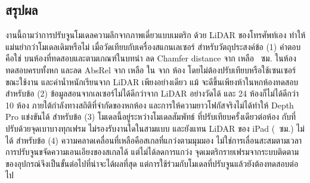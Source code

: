\subsection{สรุปผล}\label{sec:conclusion}
งานนี้ถามว่าการปรับจูนโมเดลความลึกจากภาพเดี่ยวแบบเมตริก ด้วย LiDAR ของโทรศัพท์เอง
ทำให้แม่นยำกว่าโมเดลเดิมหรือไม่ เมื่อวัดเทียบกับเครื่องสแกนเลเซอร์ สำหรับวัตถุประสงค์ข้อ (1) คำตอบคือใช่
บนห้องที่ทดสอบและตามเกณฑ์ในบทนำ \ftmain{} ลด Chamfer distance จาก \rsMETRICCM{} เหลือ \rsFTLIDARALLCM{}~ซม.
ในห้องทดสอบครบทั้งหก และลด AbsRel จาก \rsVMETRICABSREL{} เหลือ \rsVFTALLABSREL{} ใน \rsVWINS{} จาก \rsVN{} ห้อง
โดยไม่ต้องปรับเทียบหรือใช้เซนเซอร์ขณะใช้งาน และค่าน้ำหนักเรียนจาก LiDAR เพียงอย่างเดียว
แม้ \wone{} จะดีขึ้นเพียงห้าในหกห้องทดสอบ สำหรับข้อ (2) ข้อมูลสอนจากเลเซอร์ไม่ได้ดีกว่าจาก LiDAR อย่างวัดได้
และ 24 ห้องก็ไม่ได้ดีกว่า 10 ห้อง ภายใต้กำลังทางสถิติที่จำกัดของหกห้อง
และการให้ความยาวโฟกัสจริงไม่ได้ทำให้ Depth Pro แข่งขันได้ สำหรับข้อ (3) โมเดลนี้อยู่ระหว่างโมเดลสัมพัทธ์
ที่ปรับเทียบครั้งเดียวต่อห้อง กับที่ปรับด้วยจุดเบาบางทุกเฟรม ไม่รองรับงานใดในสามแบบ
และยังแทน LiDAR ของ iPad (\rsLIDARCM{}~ซม.) ไม่ได้ สำหรับข้อ (4) ความคลาดเคลื่อนที่เหลือคือสเกลที่แกว่งตามมุมมอง
ไม่ใช่การเลื่อนสะสมตามเวลา การปรับจูนขจัดความเอนเอียงของสเกลได้ แต่ไม่ได้ลดการแกว่ง
จุดเมตริกรายเฟรมจากระบบติดตามของอุปกรณ์จึงเป็นขั้นต่อไปที่น่าจะได้ผลที่สุด
แต่การใช้ร่วมกับโมเดลที่ปรับจูนแล้วยังต้องทดสอบต่อไป
